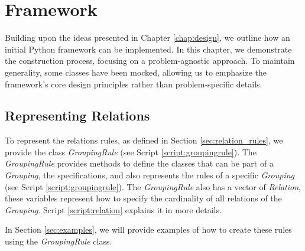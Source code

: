 
\chapter{Framework} \label{chap:framework}

    Building upon the ideas presented in Chapter \ref{chap:design}, we outline how an initial Python framework can be implemented. In this chapter, we demonstrate the construction process, focusing on a problem-agnostic approach. To maintain generality, some classes have been mocked, allowing us to emphasize the framework's core design principles rather than problem-specific details.
    

    \section{Representing Relations}
        To represent the relations rules, as defined in Section \ref{sec:relation_rules}, we provide the class \textit{GroupingRule} (see Script \ref{script:groupingrule}).
        The \textit{GroupingRule} provides methods to define the classes that can be part of a \textit{Grouping}, the specifications, and also represents the rules of a specific \textit{Grouping} (see Script \ref{script:groupingrule}). The \textit{GroupingRule} also has a vector of \textit{Relation}, these variables represent how to specify the cardinality of all relations of the \textit{Grouping}. Script \ref{script:relation} explains it in more details.
        
        In Section \ref{sec:examples}, we will provide examples of how to create these rules using the \textit{GroupingRule} class.
        
